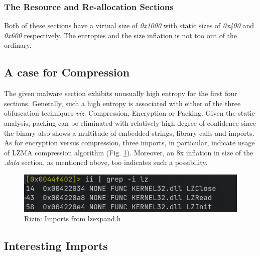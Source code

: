 \documentclass[10pt,a4paper]{article}
\begin{document}
	\subsubsection{The Resource and Re-allocation Sections}
		Both of these sections have a virtual size of \textit{0x1000} with static sizes of \textit{0x400} and \textit{0x600} respectively.
		The entropies and the size inflation is not too out of the ordinary.

\subsection{A case for Compression}
The given malware section exhibits unusually high entropy for the first four sections.
Generally, such a high entropy is associated with either of the three obfuscation techniques \textit{viz.}
Compression, Encryption or Packing.
Given the static analysis, packing can be eliminated with relatively high degree of confidence since the binary also
shows a multitude of embedded strings, library calls and imports.
As for encryption versus compression, three imports, in particular, indicate usage of LZMA \cite{lzma} compression algorithm (Fig. \ref{lzma}).
Moreover, an 8x inflation in size of the \textit{.data} section, as mentioned above, too indicates such a possibility.
\begin{figure}[!htbp]%
	\centering
	\includegraphics[width=\columnwidth]{pics/lzma.png}
	\caption{Rizin: Imports from lzexpand.h}
	\label{lzma}
\end{figure}

\subsection{Interesting Imports}
\end{document}
